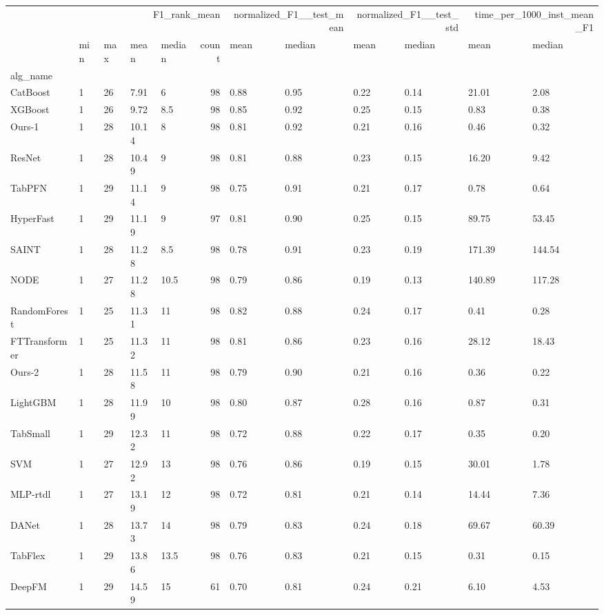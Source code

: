 \begin{tabular}{lllllrllllll}
\toprule
 & \multicolumn{5}{r}{F1_rank_mean} & \multicolumn{2}{r}{normalized_F1__test_mean} & \multicolumn{2}{r}{normalized_F1__test_std} & \multicolumn{2}{r}{time_per_1000_inst_mean_F1} \\
 & min & max & mean & median & count & mean & median & mean & median & mean & median \\
alg_name &  &  &  &  &  &  &  &  &  &  &  \\
\midrule
CatBoost & 1 & 26 & 7.91 & 6 & 98 & 0.88 & 0.95 & 0.22 & 0.14 & 21.01 & 2.08 \\
XGBoost & 1 & 26 & 9.72 & 8.5 & 98 & 0.85 & 0.92 & 0.25 & 0.15 & 0.83 & 0.38 \\
Ours-1 & 1 & 28 & 10.14 & 8 & 98 & 0.81 & 0.92 & 0.21 & 0.16 & 0.46 & 0.32 \\
ResNet & 1 & 28 & 10.49 & 9 & 98 & 0.81 & 0.88 & 0.23 & 0.15 & 16.20 & 9.42 \\
TabPFN & 1 & 29 & 11.14 & 9 & 98 & 0.75 & 0.91 & 0.21 & 0.17 & 0.78 & 0.64 \\
HyperFast & 1 & 29 & 11.19 & 9 & 97 & 0.81 & 0.90 & 0.25 & 0.15 & 89.75 & 53.45 \\
SAINT & 1 & 28 & 11.28 & 8.5 & 98 & 0.78 & 0.91 & 0.23 & 0.19 & 171.39 & 144.54 \\
NODE & 1 & 27 & 11.28 & 10.5 & 98 & 0.79 & 0.86 & 0.19 & 0.13 & 140.89 & 117.28 \\
RandomForest & 1 & 25 & 11.31 & 11 & 98 & 0.82 & 0.88 & 0.24 & 0.17 & 0.41 & 0.28 \\
FTTransformer & 1 & 25 & 11.32 & 11 & 98 & 0.81 & 0.86 & 0.23 & 0.16 & 28.12 & 18.43 \\
Ours-2 & 1 & 28 & 11.58 & 11 & 98 & 0.79 & 0.90 & 0.21 & 0.16 & 0.36 & 0.22 \\
LightGBM & 1 & 28 & 11.99 & 10 & 98 & 0.80 & 0.87 & 0.28 & 0.16 & 0.87 & 0.31 \\
TabSmall & 1 & 29 & 12.32 & 11 & 98 & 0.72 & 0.88 & 0.22 & 0.17 & 0.35 & 0.20 \\
SVM & 1 & 27 & 12.92 & 13 & 98 & 0.76 & 0.86 & 0.19 & 0.15 & 30.01 & 1.78 \\
MLP-rtdl & 1 & 27 & 13.19 & 12 & 98 & 0.72 & 0.81 & 0.21 & 0.14 & 14.44 & 7.36 \\
DANet & 1 & 28 & 13.73 & 14 & 98 & 0.79 & 0.83 & 0.24 & 0.18 & 69.67 & 60.39 \\
TabFlex & 1 & 29 & 13.86 & 13.5 & 98 & 0.76 & 0.83 & 0.21 & 0.15 & 0.31 & 0.15 \\
DeepFM & 1 & 29 & 14.59 & 15 & 61 & 0.70 & 0.81 & 0.24 & 0.21 & 6.10 & 4.53 \\

\end{tabular}
